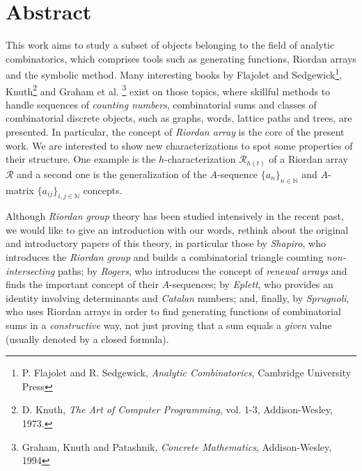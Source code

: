 \begingroup
\let\clearpage\relax
\let\cleardoublepage\relax
\let\cleardoublepage\relax

\vskip-2cm
\chapter*{Abstract}

This work aims to study
a subset of objects belonging to the field of analytic combinatorics, which
comprises tools such as generating functions, Riordan arrays and the symbolic
method. Many interesting books by Flajolet and Sedgewick\footnote{P. Flajolet
and R.  Sedgewick, \emph{Analytic Combinatorics}, Cambridge University Press},
Knuth\footnote{D. Knuth, \emph{The Art of Computer Programming}, vol.  1-3,
Addison-Wesley, 1973.} and Graham et al. \footnote{Graham, Knuth and Patashnik,
\emph{Concrete Mathematics}, Addison-Wesley, 1994} exist on those topics, where
skillful methods to handle sequences of \emph{counting numbers}, combinatorial
sums and classes of combinatorial discrete objects, such as graphs, words,
lattice paths and trees, are presented. In particular, the concept of
\emph{Riordan array} is the core of the present work.  We are interested to
show new characterizations to spot some properties of their structure. One
example is the $h$-characterization $\mathcal{R}_{h(t)}$ of a Riordan array
$\mathcal{R}$ and a second one is the generalization of the $A$-sequence
$\lbrace a_{n}\rbrace_{n\in\mathbb{N}}$ and $A$-matrix $\lbrace
a_{ij}\rbrace_{i,j\in\mathbb{N}}$ concepts.

Although \emph{Riordan group} theory has been studied intensively in the recent past, we would
like to give an introduction with our words, rethink about the original and
introductory papers of this theory, in particular those by \emph{Shapiro}, who
introduces the \emph{Riordan group} and builds a combinatorial triangle
counting \emph{non-intersecting} paths; by \emph{Rogers}, who introduces the
concept of \emph{renewal arrays} and finds the important concept of their
$A$-sequences; by \emph{Eplett}, who provides an identity involving
determinants and \emph{Catalan} numbers; and, finally, by \emph{Sprugnoli}, who
uses Riordan arrays in order to find generating functions of combinatorial sums
in a \emph{constructive} way, not just proving that a sum equals a \emph{given}
value (usually denoted by a closed formula). 

